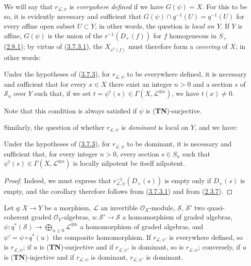 We will say that $r_{\mathcal{L},\psi}$ is \emph{everywhere defined} if we have
$G(\psi)=X$. For this to be so, it is evidently necessary and sufficient that
$G(\psi)\cap q^{-1}(U)=q^{-1}(U)$ for every affine open subset $U\subset Y$;
in other words, the question is \emph{local on $Y$}. If $Y$ is affine,
$G(\psi)$ is the union of the $r^{-1}(D_+(f))$ for $f$ homogeneous in $S_+$
(\hyperref[II.2.8.1]{2.8.1}); by virtue of
(\hyperref[II.3.7.3.1]{3.7.3.1}), the $X_{\psi^\flat(f)}$ must therefore
form a \emph{covering} of $X$; in other words:

\begin{corollary}[3.7.4]
\label{II.3.7.4}
Under the hypotheses of (\hyperref[II.3.7.3]{3.7.3}), for
$r_{\mathcal{L},\psi}$ to be everywhere defined, it is necessary and sufficient
that for every $x\in X$ there exist an integer $n>0$ and a section $s$ of
$\mathcal{S}_n$ over $Y$ such that, if we set
$t=\psi^\flat(s)\in\Gamma(X,\mathcal{L}^{\otimes n})$, we have $t(x)\neq0$.
\end{corollary}


Note that this condition is always satisfied if $\psi$ is
(\textbf{TN})-surjective.

Similarly, the question of whether $r_{\mathcal{L},\psi}$ is \emph{dominant}
is local on $Y$, and we have:

\begin{corollary}[3.7.5]
\label{II.3.7.5}
Under the hypotheses of (\hyperref[II.3.7.3]{3.7.3}), for
$r_{\mathcal{L},\psi}$ to be dominant, it is necessary and sufficient that, for
every integer $n>0$, every section $s\in S_n$ such that
$\psi^\flat(s)\in\Gamma(X,\mathcal{L}^{\otimes n})$ is locally
nilpotent be itself nilpotent.
\end{corollary}

\begin{proof}
Indeed, we must express that
$r_{\mathcal{L},\psi}^{-1}(D_+(s))$ is empty only if $D_+(s)$ is empty,
and the corollary therefore follows from
(\hyperref[II.3.7.3.1]{3.7.3.1}) and from
(\hyperref[II.2.3.7]{2.3.7}).
\end{proof}

\begin{proposition}[3.7.6]
\label{II.3.7.6}
Let $q:X\to Y$ be a morphism, $\mathcal{L}$ an invertible
$\mathcal{O}_X$-module, $\mathcal{S}$, $\mathcal{S}'$ two quasi-coherent graded
$\mathcal{O}_Y$-algebras,
$u:\mathcal{S}'\to\mathcal{S}$ a homomorphism of graded algebras,
$\psi:q^*(\mathcal{S})\to\bigoplus_{n\geq0}\mathcal{L}^{\otimes n}$ a
homomorphism of graded algebras, and
$\psi'=\psi\circ q^*(u)$ the composite homomorphism. If
$r_{\mathcal{L},\psi'}$ is everywhere defined, so is
$r_{\mathcal{L},\psi}$; if $u$ is (\textbf{TN})-surjective and if
$r_{\mathcal{L},\psi'}$ is dominant, so is
$r_{\mathcal{L},\psi}$; conversely, if $u$ is (\textbf{TN})-injective and if
$r_{\mathcal{L},\psi}$ is dominant, $r_{\mathcal{L},\psi'}$ is dominant.
\end{proposition}

